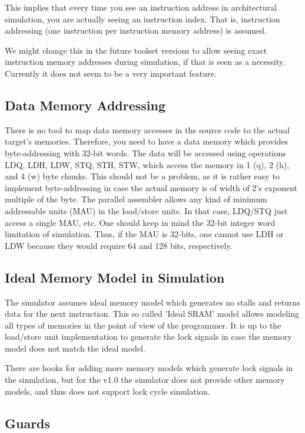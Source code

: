 \documentclass[a4paper,twoside]{tceusermanual}
\begin{document}
This implies that every time you see an instruction address in
architectural simulation, you are actually seeing an instruction index.
That is, instruction addressing (one instruction per instruction memory
address) is assumed.

We might change this in the future toolset versions to allow seeing exact
instruction memory addresses during simulation, if that is seen as a
necessity. Currently it does not seem to be a very important feature.

\subsection{Data Memory Addressing}

There is no tool to map data memory accesses in the source code to the
actual target's memories. Therefore, you need to have a data memory which
provides byte-addressing with 32-bit words. The data will be accessed using
operations LDQ, LDH, LDW, STQ, STH, STW, which access the memory in 1 (q),
2 (h), and 4 (w) byte chunks. This should not be a problem, as it is rather
easy to implement byte-addressing in case the actual memory is of width of
2's exponent multiple of the byte. The parallel assembler allows any kind
of minimum addressable units (MAU) in the load/store units. In that case,
LDQ/STQ just access a single MAU, etc. One should keep in mind the 32-bit
integer word limitation of simulation. Thus, if the MAU is 32-bits, one
cannot use LDH or LDW because they would require 64 and 128 bits,
respectively.

\subsection{Ideal Memory Model in Simulation}

The simulator assumes ideal memory model which generates no stalls and
returns data for the next instruction. This so called 'Ideal SRAM' model
allows modeling all types of memories in the point of view of the
programmer. It is up to the load/store unit implementation to generate the
lock signals in case the memory model does not match the ideal model.

There are hooks for adding more memory models which generate lock signals
in the simulation, but for the v1.0 the simulator does not provide other
memory models, and thus does not support lock cycle simulation.

\subsection{Guards}
\end{document}

